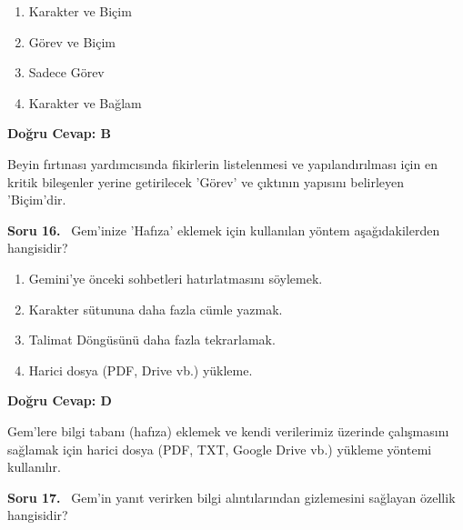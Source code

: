 \documentclass[11pt,a4paper,openany]{book}
\begin{document}
\begin{enumerate}[label=\Alph*), leftmargin=25pt, topsep=4pt, itemsep=2pt]
        \item Karakter ve Biçim
        \item Görev ve Biçim
        \item Sadece Görev
        \item Karakter ve Bağlam
\end{enumerate}

\vspace{4pt}
\begin{tcolorbox}[title=Cevap ve Açıklama, colback=gray!3!white, colframe=primarycolor!90!black, arc=2mm, fonttitle=\bfseries\sffamily, top=6pt, bottom=6pt]
    \textbf{Doğru Cevap: B}

    \vspace{2pt}
    Beyin fırtınası yardımcısında fikirlerin listelenmesi ve yapılandırılması için en kritik bileşenler yerine getirilecek 'Görev' ve çıktının yapısını belirleyen 'Biçim'dir.
\end{tcolorbox}
\vspace{10pt}
\needspace{5cm}
\vspace{8pt}
\noindent\textbf{\large\sffamily Soru 16.} \ Gem'inize 'Hafıza' eklemek için kullanılan yöntem aşağıdakilerden hangisidir?

\begin{enumerate}[label=\Alph*), leftmargin=25pt, topsep=4pt, itemsep=2pt]
        \item Gemini'ye önceki sohbetleri hatırlatmasını söylemek.
        \item Karakter sütununa daha fazla cümle yazmak.
        \item Talimat Döngüsünü daha fazla tekrarlamak.
        \item Harici dosya (PDF, Drive vb.) yükleme.
\end{enumerate}

\vspace{4pt}
\begin{tcolorbox}[title=Cevap ve Açıklama, colback=gray!3!white, colframe=primarycolor!90!black, arc=2mm, fonttitle=\bfseries\sffamily, top=6pt, bottom=6pt]
    \textbf{Doğru Cevap: D}

    \vspace{2pt}
    Gem'lere bilgi tabanı (hafıza) eklemek ve kendi verilerimiz üzerinde çalışmasını sağlamak için harici dosya (PDF, TXT, Google Drive vb.) yükleme yöntemi kullanılır.
\end{tcolorbox}
\vspace{10pt}
\needspace{5cm}
\vspace{8pt}
\noindent\textbf{\large\sffamily Soru 17.} \ Gem'in yanıt verirken bilgi alıntılarından gizlemesini sağlayan özellik hangisidir?
\end{document}
